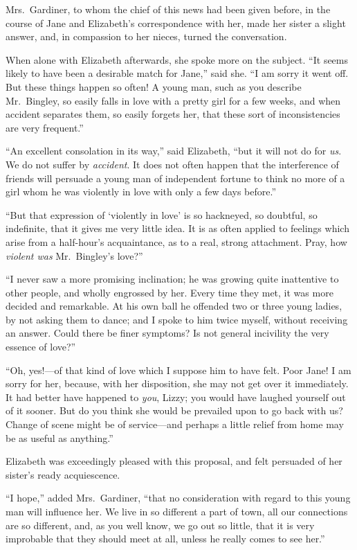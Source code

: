 Mrs.\ Gardiner, to whom the chief of this news had been given
before, in the course of Jane and Elizabeth's correspondence
with her, made her sister a slight answer, and, in compassion to
her nieces, turned the conversation.

When alone with Elizabeth afterwards, she spoke more on the
subject.  ``It seems likely to have been a desirable match for
Jane,'' said she.  ``I am sorry it went off.  But these things
happen so often!  A young man, such as you describe Mr.\ Bingley,
so easily falls in love with a pretty girl for a few weeks, and
when accident separates them, so easily forgets her, that these
sort of inconsistencies are very frequent.''

``An excellent consolation in its way,'' said Elizabeth, ``but it will
not do for \emph{us}.  We do not suffer by \emph{accident}.  It does not often
happen that the interference of friends will persuade a young
man of independent fortune to think no more of a girl whom he
was violently in love with only a few days before.''

``But that expression of `violently in love' is so hackneyed,
so doubtful, so indefinite, that it gives me very little idea.
It is as often applied to feelings which arise from a half-hour's
acquaintance, as to a real, strong attachment.  Pray, how
\emph{violent was} Mr.\ Bingley's love?''

``I never saw a more promising inclination; he was growing quite
inattentive to other people, and wholly engrossed by her.  Every
time they met, it was more decided and remarkable.  At his own
ball he offended two or three young ladies, by not asking them to
dance; and I spoke to him twice myself, without receiving an answer.
Could there be finer symptoms?  Is not general incivility the very
essence of love?''

``Oh, yes!---of that kind of love which I suppose him to have felt.
Poor Jane!  I am sorry for her, because, with her disposition, she
may not get over it immediately.  It had better have happened to
\emph{you}, Lizzy; you would have laughed yourself out of it sooner.
But do you think she would be prevailed upon to go back with
us?  Change of scene might be of service---and perhaps a little
relief from home may be as useful as anything.''

Elizabeth was exceedingly pleased with this proposal, and felt
persuaded of her sister's ready acquiescence.

``I hope,'' added Mrs.\ Gardiner, ``that no consideration with
regard to this young man will influence her.  We live in so
different a part of town, all our connections are so different, and,
as you well know, we go out so little, that it is very improbable
that they should meet at all, unless he really comes to see her.''

